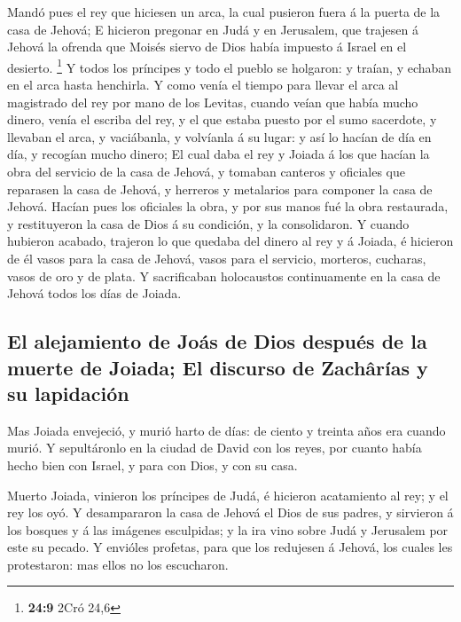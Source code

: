  Mandó pues el rey que hiciesen un arca, la cual pusieron
fuera á la puerta de la casa de Jehová;  E hicieron pregonar
en Judá y en Jerusalem, que trajesen á Jehová la ofrenda que Moisés
siervo de Dios había impuesto á Israel en el desierto. \footnote{\textbf{24:9}
  2Cró 24,6}  Y todos los príncipes y todo el pueblo se
holgaron: y traían, y echaban en el arca hasta henchirla. 
Y como venía el tiempo para llevar el arca al magistrado del rey por
mano de los Levitas, cuando veían que había mucho dinero, venía el
escriba del rey, y el que estaba puesto por el sumo sacerdote, y
llevaban el arca, y vaciábanla, y volvíanla á su lugar: y así lo hacían
de día en día, y recogían mucho dinero;  El cual daba el
rey y Joiada á los que hacían la obra del servicio de la casa de Jehová,
y tomaban canteros y oficiales que reparasen la casa de Jehová, y
herreros y metalarios para componer la casa de Jehová. 
Hacían pues los oficiales la obra, y por sus manos fué la obra
restaurada, y restituyeron la casa de Dios á su condición, y la
consolidaron.  Y cuando hubieron acabado, trajeron lo que
quedaba del dinero al rey y á Joiada, é hicieron de él vasos para la
casa de Jehová, vasos para el servicio, morteros, cucharas, vasos de oro
y de plata. Y sacrificaban holocaustos continuamente en la casa de
Jehová todos los días de Joiada.

\hypertarget{el-alejamiento-de-jouxe1s-de-dios-despuuxe9s-de-la-muerte-de-joiada-el-discurso-de-zachuxe2ruxedas-y-su-lapidaciuxf3n}{%
\subsection{El alejamiento de Joás de Dios después de la muerte de
Joiada; El discurso de Zachârías y su
lapidación}\label{el-alejamiento-de-jouxe1s-de-dios-despuuxe9s-de-la-muerte-de-joiada-el-discurso-de-zachuxe2ruxedas-y-su-lapidaciuxf3n}}

 Mas Joiada envejeció, y murió harto de días: de ciento y
treinta años era cuando murió.  Y sepultáronlo en la ciudad
de David con los reyes, por cuanto había hecho bien con Israel, y para
con Dios, y con su casa.

 Muerto Joiada, vinieron los príncipes de Judá, é hicieron
acatamiento al rey; y el rey los oyó.  Y desampararon la
casa de Jehová el Dios de sus padres, y sirvieron á los bosques y á las
imágenes esculpidas; y la ira vino sobre Judá y Jerusalem por este su
pecado.  Y envióles profetas, para que los redujesen á
Jehová, los cuales les protestaron: mas ellos no los escucharon.

